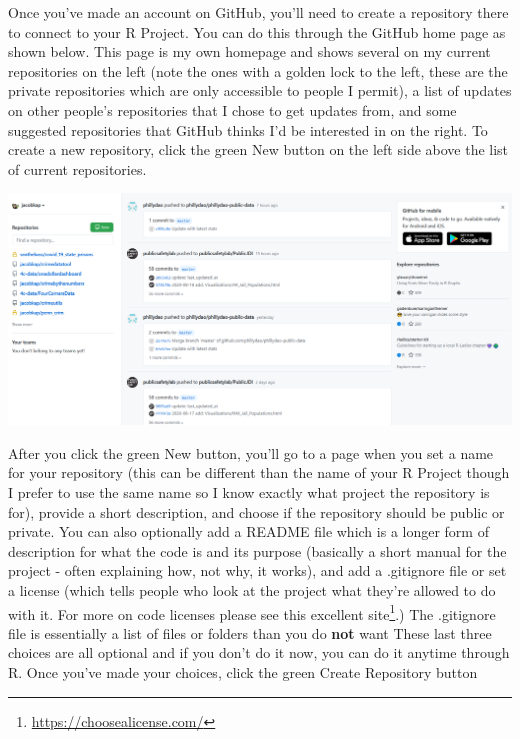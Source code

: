 \documentclass[
]{krantz}
\renewcommand{\href}[2]{#2\footnote{\url{#1}}}
\begin{document}
Once you've made an account on GitHub, you'll need to create a repository there to connect to your R Project. You can do this through the GitHub home page as shown below. This page is my own homepage and shows several on my current repositories on the left (note the ones with a golden lock to the left, these are the private repositories which are only accessible to people I permit), a list of updates on other people's repositories that I chose to get updates from, and some suggested repositories that GitHub thinks I'd be interested in on the right. To create a new repository, click the green New button on the left side above the list of current repositories.

\includegraphics{images/Github_new_repo.PNG}

After you click the green New button, you'll go to a page when you set a name for your repository (this can be different than the name of your R Project though I prefer to use the same name so I know exactly what project the repository is for), provide a short description, and choose if the repository should be public or private. You can also optionally add a README file which is a longer form of description for what the code is and its purpose (basically a short manual for the project - often explaining how, not why, it works), and add a .gitignore file or set a license (which tells people who look at the project what they're allowed to do with it. For more on code licenses please see this excellent \href{https://choosealicense.com/}{site}.) The .gitignore file is essentially a list of files or folders than you do \textbf{not} want These last three choices are all optional and if you don't do it now, you can do it anytime through R. Once you've made your choices, click the green Create Repository button
\end{document}

